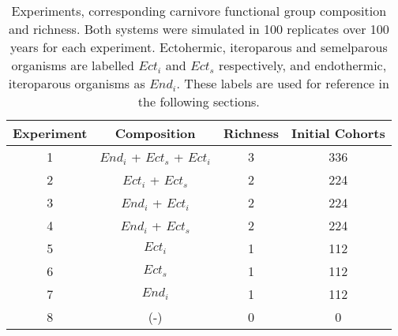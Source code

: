 \begin{table}[htb!]
\centering
\caption[Functional group definitions]{Experiments, corresponding carnivore functional group composition and richness. Both systems were simulated in 100 replicates over 100 years for each experiment. Ectohermic, iteroparous and semelparous organisms are labelled $Ect_i$ and $Ect_s$ respectively, and endothermic, iteroparous organisms as $End_i$. These labels are used for reference in the following sections.} 
\label{tab:mat:exp}
\begin{tabular*}{\textwidth}{@{\extracolsep{\fill} } cccc}
  \toprule
\textbf{Experiment} & \textbf{Composition} & \textbf{Richness} & \textbf{Initial Cohorts} \\ 
  \midrule
  1 & $End_i$ + $Ect_s$ + $Ect_i$ & 3 & 336 \\ 
   [1ex]  2 & $Ect_i$ + $Ect_s$ & 2 & 224 \\ 
    3 & $End_i$ + $Ect_i$ & 2 & 224 \\ 
    4 & $End_i$ + $Ect_s$ & 2 & 224 \\ 
   [1ex]  5 & $Ect_i$ & 1 & 112 \\ 
    6 & $Ect_s$ & 1 & 112 \\ 
    7 & $End_i$ & 1 & 112 \\ 
   [1ex]  8 & (-) & 0 & 0 \\ 
   \bottomrule
\end{tabular*}
\end{table}
